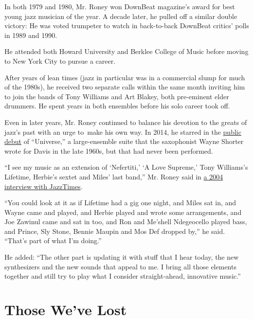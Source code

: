 In both 1979 and 1980, Mr. Roney won DownBeat magazine's award for best
young jazz musician of the year. A decade later, he pulled off a similar
double victory: He was voted trumpeter to watch in back-to-back DownBeat
critics' polls in 1989 and 1990.

He attended both Howard University and Berklee College of Music before
moving to New York City to pursue a career.

After years of lean times (jazz in particular was in a commercial slump
for much of the 1980s), he received two separate calls within the same
month inviting him to join the bands of Tony Williams and Art Blakey,
both pre-eminent elder drummers. He spent years in both ensembles before
his solo career took off.

Even in later years, Mr. Roney continued to balance his devotion to the
greats of jazz's past with an urge to~make his own way. In 2014, he
starred in the
\href{https://www.npr.org/2014/10/16/356653950/to-miles-from-wayne}{public
debut} of ``Universe,'' a large-ensemble suite that the saxophonist
Wayne Shorter wrote for Davis in the late 1960s, but that had never been
performed.

``I see my music as an extension of `Nefertiti,' `A Love Supreme,' Tony
Williams's Lifetime, Herbie's sextet and Miles' last band,'' Mr. Roney
said in
\href{https://jazztimes.com/features/profiles/wallace-roney-the-man-with-the-golden-horn/}{a
2004 interview with JazzTimes}.

``You could look at it as if Lifetime had a gig one night, and Miles sat
in, and Wayne came and played, and Herbie played and wrote some
arrangements, and Joe Zawinul came and sat in too, and Ron and Me'shell
Ndegeocello played bass, and Prince, Sly Stone, Bennie Maupin and Mos
Def dropped by,'' he said. ``That's part of what I'm doing.''

He added: ``The other part is updating it with stuff that I hear today,
the new synthesizers and the new sounds that appeal to me. I bring all
those elements together and still try to play what I consider
straight-ahead, innovative music.''

\href{https://www.nytimes.com/interactive/2020/obituaries/people-died-coronavirus-obituaries.html?action=click\&pgtype=Article\&state=default\&region=BELOW_MAIN_CONTENT\&context=covid_obits_promo}{}

\hypertarget{those-weve-lost}{%
\section{Those We've Lost}\label{those-weve-lost}}

